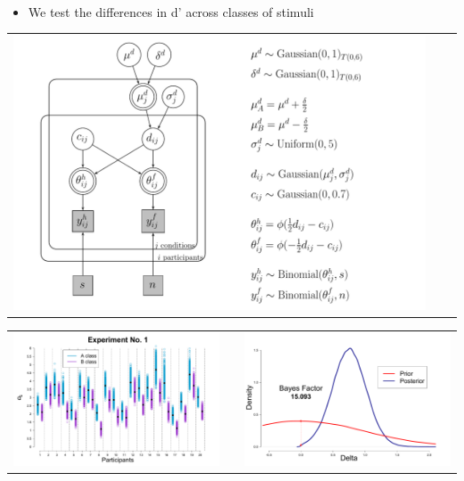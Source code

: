 \documentclass[final]{beamer}
\newlength{\onecolwid}
\newlength{\twocolwid}
\begin{document}
\begin{frame}[t]
\begin{columns}[t]
\begin{column}{\twocolwid}
\begin{columns}[t,totalwidth=\twocolwid]
\begin{column}{\onecolwid}
\begin{alertblock}{}
$\qquad$
\begin{itemize}
\item We test the differences in d' across classes of stimuli
\end{itemize}
\begin{center}
\begin{tabular}{ccc}
\includegraphics[width=0.8\linewidth]{Figures/1_DiffD.pdf}
\end{tabular}
\end{center}

\begin{center}
\begin{tabular}{ccc}
\includegraphics[width=0.5\linewidth]{Figures/1-Exp1_1.pdf} & \hfill & \includegraphics[width=0.47\linewidth]{Figures/1-Exp1_2.pdf}
\end{tabular}
\end{center}


\end{alertblock}
\end{column}
\end{columns}
\end{column}
\end{columns}
\end{frame}
\end{document}
